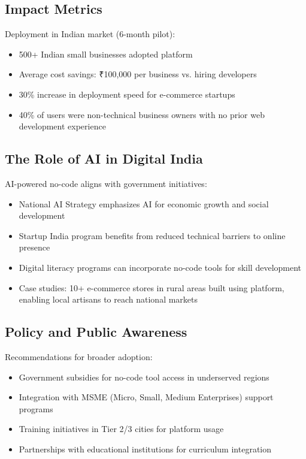 \documentclass[10pt, conference, letterpaper]{IEEEtran}
\begin{document}
\subsection{Impact Metrics}
Deployment in Indian market (6-month pilot):
\begin{itemize}
    \item 500+ Indian small businesses adopted platform
    \item Average cost savings: ₹100,000 per business vs. hiring developers
    \item 30\% increase in deployment speed for e-commerce startups
    \item 40\% of users were non-technical business owners with no prior web development experience
\end{itemize}

\subsection{The Role of AI in Digital India}
AI-powered no-code aligns with government initiatives:
\begin{itemize}
    \item National AI Strategy emphasizes AI for economic growth and social development
    \item Startup India program benefits from reduced technical barriers to online presence
    \item Digital literacy programs can incorporate no-code tools for skill development
    \item Case studies: 10+ e-commerce stores in rural areas built using platform, enabling local artisans to reach national markets
\end{itemize}

\subsection{Policy and Public Awareness}
Recommendations for broader adoption:
\begin{itemize}
    \item Government subsidies for no-code tool access in underserved regions
    \item Integration with MSME (Micro, Small, Medium Enterprises) support programs
    \item Training initiatives in Tier 2/3 cities for platform usage
    \item Partnerships with educational institutions for curriculum integration
\end{itemize}
\end{document}
